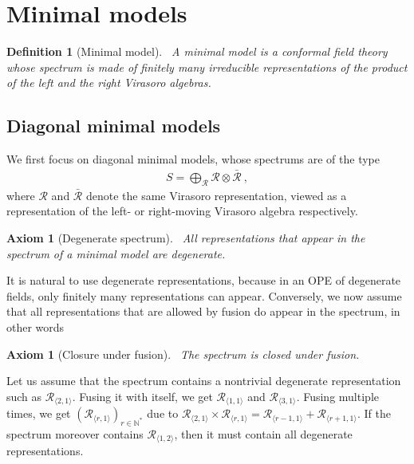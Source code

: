 \documentclass[12pt, a4paper]{article}
\theoremstyle{break}
\newtheorem{hyp}[exo]{Axiom}
\newtheorem{defn}[exo]{Definition}
\begin{document}
\section{Minimal models}

\begin{defn}[Minimal model]
 ~\label{def:mm}
 A minimal model is a conformal field theory whose spectrum is made of finitely many irreducible representations of the product of the left and the right Virasoro algebras.
\end{defn}

\subsection{Diagonal minimal models}

We first focus on diagonal minimal models, whose spectrums are of the type
\begin{align}
 S = \bigoplus_\mathcal{R} \mathcal{R}\otimes  \mathcal{\bar R}\ ,
\end{align}
where $\mathcal{R}$ and $ \mathcal{\bar R}$ denote the same Virasoro representation, viewed as a representation of the left- or right-moving Virasoro algebra respectively.

\begin{hyp}[Degenerate spectrum]
 ~\label{hyp:deg}
 All representations that appear in the spectrum of a minimal model are degenerate.
\end{hyp}
It is natural to use degenerate representations, because in an OPE of degenerate fields, only finitely many representations can appear. Conversely, we now assume that all representations that are allowed by fusion do appear in the spectrum, in other words

\begin{hyp}[Closure under fusion]
 ~\label{hyp:stab}
 The spectrum is closed under fusion. 
\end{hyp}

Let us assume that the spectrum contains a nontrivial degenerate representation such as $\mathcal{R}_{\langle 2,1\rangle}$. Fusing it with itself, we get $\mathcal{R}_{\langle 1, 1\rangle}$ and $\mathcal{R}_{\langle 3,1\rangle}$. Fusing multiple times, we get $(\mathcal{R}_{\langle r, 1\rangle})_{r\in\mathbb{N}^*}$ due to $\mathcal{R}_{\langle 2,1\rangle} \times \mathcal{R}_{\langle r,1\rangle} = \mathcal{R}_{\langle r-1,1\rangle}  + \mathcal{R}_{\langle r+1,1\rangle}$. If the spectrum moreover contains $\mathcal{R}_{\langle 1,2\rangle}$, then it must contain all degenerate representations. 
\end{document}
